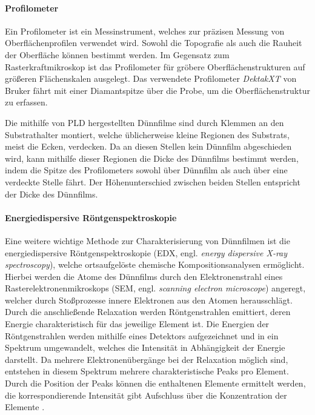 \paragraph{Profilometer}
Ein Profilometer ist ein Messinstrument, welches zur präzisen Messung von Oberflächenprofilen verwendet wird.
Sowohl die Topografie als auch die Rauheit der Oberfläche können bestimmt werden.
Im Gegensatz zum Rasterkraftmikroskop ist das Profilometer für gröbere Oberflächenstrukturen auf größeren Flächenskalen
ausgelegt.
Das verwendete Profilometer \textit{DektakXT} von Bruker fährt mit einer Diamantspitze über die Probe, um
die Oberflächenstruktur zu erfassen.

Die mithilfe von PLD hergestellten Dünnfilme sind durch Klemmen an den Substrathalter montiert, welche
üblicherweise kleine Regionen des Substrats, meist die Ecken, verdecken.
Da an diesen Stellen kein Dünnfilm abgeschieden wird, kann mithilfe dieser Regionen die Dicke des
Dünnfilms bestimmt werden, indem die Spitze des Profilometers sowohl über Dünnfilm als auch über eine
verdeckte Stelle fährt.
Der Höhenunterschied zwischen beiden Stellen entspricht der Dicke des Dünnfilms.

\paragraph{Energiedispersive Röntgenspektroskopie}
Eine weitere wichtige Methode zur Charakterisierung von Dünnfilmen ist die energiedispersive Röntgenspektroskopie
(EDX, engl. \textit{energy dispersive X-ray spectroscopy}), welche ortsaufgelöste chemische Kompositionsanalysen
ermöglicht.
Hierbei werden die Atome des Dünnfilms durch den Elektronenstrahl eines Rasterelektronenmikroskops (SEM, engl.
\textit{scanning electron microscope}) angeregt, welcher durch Stoßprozesse innere Elektronen aus den Atomen
herausschlägt.
Durch die anschließende Relaxation werden Röntgenstrahlen emittiert, deren Energie charakteristisch für das jeweilige
Element ist.
Die Energien der Röntgenstrahlen werden mithilfe eines Detektors aufgezeichnet und in ein Spektrum umgewandelt, welches
die Intensität in Abhängigkeit der Energie darstellt.
Da mehrere Elektronenübergänge bei der Relaxation möglich sind, entstehen in diesem Spektrum mehrere charakteristische
Peaks pro Element.
Durch die Position der Peaks können die enthaltenen Elemente ermittelt werden,
die korrespondierende Intensität gibt Aufschluss über die Konzentration der Elemente \autocite{edx}.




